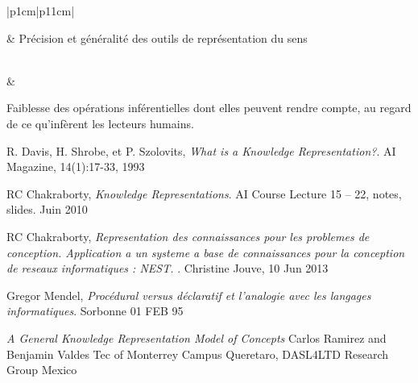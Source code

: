 \documentclass[12pt,a4paper]{report}
\begin{document}
\FloatBarrier
\begin{table}[H]
\centering
\begin{tabular}{|p{1cm}|p{11cm}|}
\hline
{} \\ 
\hline
\parbox[t]{4mm}{} &
Précision et généralité des outils de représentation du sens\rule{0pt}{10ex}
\\   &\rule{0pt}{4ex}
Faiblesse des opérations inférentielles dont elles peuvent rendre compte, au regard de ce qu’infèrent les lecteurs humains.
\\   \hline
\end{tabular}
\end{table}
\FloatBarrier

\begin{thebibliography}{9}
R. Davis, H. Shrobe, et P. Szolovits,
\emph{What is a Knowledge Representation?}.
AI Magazine, 14(1):17-33, 1993

RC Chakraborty,
\emph{Knowledge Representations}.
AI Course Lecture 15 – 22, notes, slides. Juin 2010

RC Chakraborty,
\emph{Representation des connaissances pour les problemes de
conception. Application a un systeme a base de
connaissances pour la conception de reseaux
informatiques : NEST.
}.
Christine Jouve, 10 Jun 2013

Gregor Mendel,
\emph{Procédural versus déclaratif et l'analogie avec les langages informatiques}.
Sorbonne 01 FEB 95

\emph{A General Knowledge Representation
Model of Concepts}
Carlos Ramirez and Benjamin Valdes
Tec of Monterrey Campus Queretaro, DASL4LTD Research Group
Mexico

\end{thebibliography}
\end{document}
